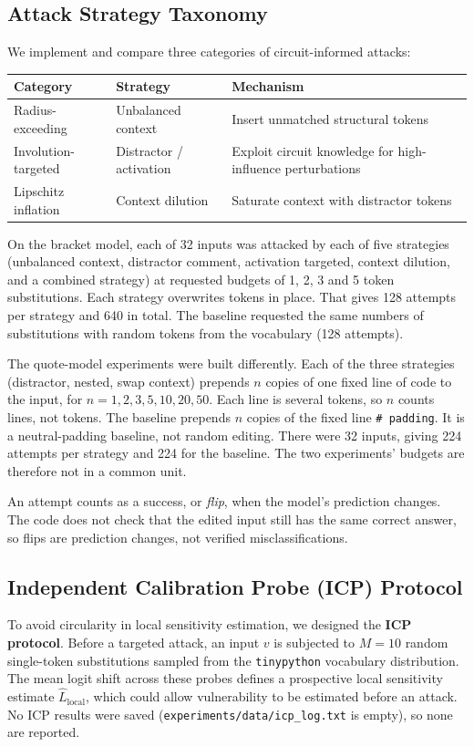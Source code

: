 \documentclass[11pt]{article}
\newcommand{\Lhat}{\hat{L}}
\begin{document}
\subsection{Attack Strategy Taxonomy}\label{sec:attacks}
We implement and compare three categories of circuit-informed attacks:
\begin{center}
\small
\begin{tabular}{@{}lll@{}}
\toprule
Category & Strategy & Mechanism \\
\midrule
Radius-exceeding & Unbalanced context & Insert unmatched structural tokens \\
Involution-targeted & Distractor / activation & Exploit circuit knowledge for high-influence perturbations \\
Lipschitz inflation & Context dilution & Saturate context with distractor tokens \\
\bottomrule
\end{tabular}
\end{center}
On the bracket model, each of 32 inputs was attacked by each of five strategies (unbalanced context, distractor comment, activation targeted, context dilution, and a combined strategy) at requested budgets of 1, 2, 3 and 5 token substitutions. Each strategy overwrites tokens in place. That gives 128 attempts per strategy and 640 in total. The baseline requested the same numbers of substitutions with random tokens from the vocabulary (128 attempts).

The quote-model experiments were built differently. Each of the three strategies (distractor, nested, swap context) prepends $n$ copies of one fixed line of code to the input, for $n = 1, 2, 3, 5, 10, 20, 50$. Each line is several tokens, so $n$ counts lines, not tokens. The baseline prepends $n$ copies of the fixed line \texttt{\# padding}. It is a neutral-padding baseline, not random editing. There were 32 inputs, giving 224 attempts per strategy and 224 for the baseline. The two experiments' budgets are therefore not in a common unit.

An attempt counts as a success, or \emph{flip}, when the model's prediction changes. The code does not check that the edited input still has the same correct answer, so flips are prediction changes, not verified misclassifications.

\subsection{Independent Calibration Probe (ICP) Protocol}\label{sec:icp}
To avoid circularity in local sensitivity estimation, we designed the \textbf{ICP protocol}. Before a targeted attack, an input $v$ is subjected to $M = 10$ random single-token substitutions sampled from the \texttt{tinypython} vocabulary distribution. The mean logit shift across these probes defines a prospective local sensitivity estimate $\Lhat_{\mathrm{local}}$, which could allow vulnerability to be estimated before an attack. No ICP results were saved (\texttt{experiments/data/icp\_log.txt} is empty), so none are reported.
\end{document}
